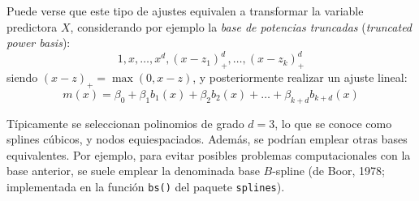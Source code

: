 \documentclass[
]{book}
\theoremstyle{break}
\theoremstyle{definition}
\theoremstyle{definition}
\theoremstyle{definition}
\theoremstyle{remark}
\begin{document}
Puede verse que este tipo de ajustes equivalen a transformar la variable predictora \(X\), considerando por ejemplo la \emph{base de potencias truncadas} (\emph{truncated power basis}):
\[1, x, \ldots, x^d, (x-z_1)_+^d,\ldots,(x-z_k)_+^d\]
siendo \((x - z)_+ = \max(0, x - z)\), y posteriormente realizar un ajuste lineal:
\[m(x) = \beta_0 + \beta_1 b_1(x) +  \beta_2 b_2(x) + \ldots  + \beta_{k+d} b_{k+d}(x)\]

Típicamente se seleccionan polinomios de grado \(d=3\), lo que se conoce como splines cúbicos, y nodos equiespaciados.
Además, se podrían emplear otras bases equivalentes. Por ejemplo, para evitar posibles problemas computacionales con la base anterior, se suele emplear la denominada base \(B\)-spline (de Boor, 1978; implementada en la función \texttt{bs()} del paquete \texttt{splines}).
\end{document}
